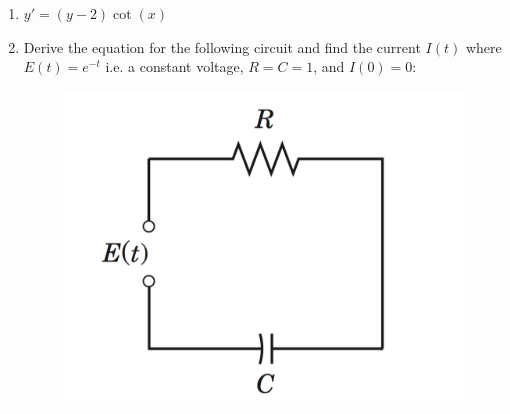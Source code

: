 \documentclass[letterpaper, fontsize=12pt]{scrartcl} %
\numberwithin{equation}{section} %
\numberwithin{figure}{section} %
\numberwithin{table}{section} %
\begin{document}
\begin{enumerate}
\begin{enumerate}[label = (\alph*)]
\item $y' = (y-2)\cot(x)$


\item Derive the equation for the following circuit and find the current $I(t)$ where $E(t) = e^{-t}$ i.e. a constant voltage, $R = C = 1$, and $I(0) = 0$: 

\begin{figure}[H]
\centering \includegraphics[width=0.5\columnwidth]{midterm1review_circuit.png}
\end{figure}

%


\end{enumerate}
\end{enumerate}
\end{document}
